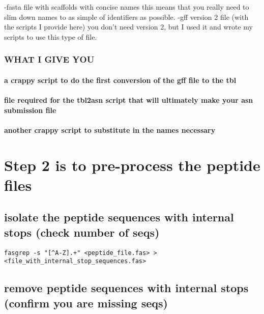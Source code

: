 \documentclass[11pt]{article}
\begin{document}
 -fasta file with scaffolds with concise names
    this means that you really need to slim down names to as simple of
    identifiers as possible. 
 -gff version 2 file (with the scripts I provide here)
    you don't need version 2, but I used it and wrote my scripts to
    use this type of file. 

\subsubsection*{WHAT I GIVE YOU}
\label{sec-1.3.2}

\paragraph*{a crappy script to do the first conversion of the gff file to the tbl}
\label{sec-1.3.2.1}

\paragraph*{file required for the tbl2asn script that will ultimately make your  asn submission file}
\label{sec-1.3.2.2}

\paragraph*{another crappy script to substitute in the names necessary}
\label{sec-1.3.2.3}

    
\section*{Step 2 is to pre-process the peptide files}
\label{sec-2}

\subsection*{isolate the peptide sequences with internal stops (check number of seqs)}
\label{sec-2.1}


\begin{verbatim}
fasgrep -s "[^A-Z].+" <peptide_file.fas> > <file_with_internal_stop_sequences.fas>
\end{verbatim}


\subsection*{remove peptide sequences with internal stops (confirm you are missing seqs)}
\label{sec-2.2}
\end{document}
